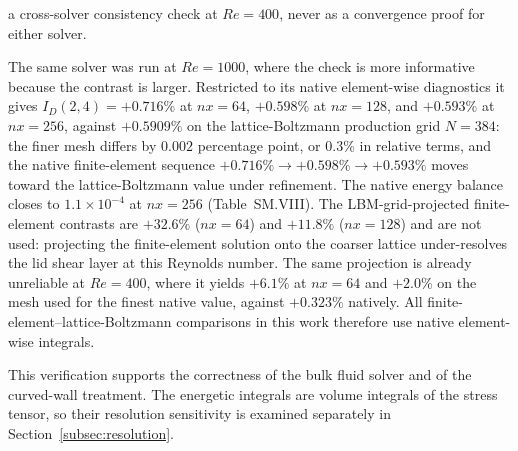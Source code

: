 a cross-solver consistency check at $Re = 400$, never as a convergence proof for either solver.

The same solver was run at $Re=1000$, where the check is more informative because the contrast is larger. Restricted to its native element-wise diagnostics it gives $I_D(2,4)=+0.716\%$ at $nx=64$, $+0.598\%$ at $nx=128$, and $+0.593\%$ at $nx=256$, against $+0.5909\%$ on the lattice-Boltzmann production grid $N=384$: the finer mesh differs by $0.002$ percentage point, or $0.3\%$ in relative terms, and the native finite-element sequence $+0.716\%\to+0.598\%\to+0.593\%$ moves toward the lattice-Boltzmann value under refinement. The native energy balance closes to $1.1\times10^{-4}$ at $nx=256$ (Table~SM.VIII). The LBM-grid-projected finite-element contrasts are $+32.6\%$ ($nx=64$) and $+11.8\%$ ($nx=128$) and are not used: projecting the finite-element solution onto the coarser lattice under-resolves the lid shear layer at this Reynolds number. The same projection is already unreliable at $Re=400$, where it yields $+6.1\%$ at $nx=64$ and $+2.0\%$ on the mesh used for the finest native value, against $+0.323\%$ natively. All finite-element--lattice-Boltzmann comparisons in this work therefore use native element-wise integrals.

This verification supports the correctness of the bulk fluid solver and of the curved-wall treatment. The energetic integrals are volume integrals of the stress tensor, so their resolution sensitivity is examined separately in Section~\ref{subsec:resolution}.


